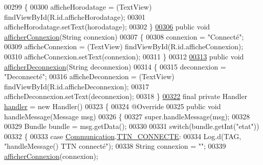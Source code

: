 \begin{DoxyCode}
{{{00299     \{
00300         afficheHorodatage = (TextView) findViewById(R.id.afficheHorodatage);
00301         afficheHorodatage.setText(horodatage);
00302     \}
\hyperlink{classcom_1_1example_1_1bee__honeyt_1_1_i_h_m_mobile_a09149878e7ab1c24fa1b3aea037bd3fc}{00306}     \textcolor{keyword}{public} \textcolor{keywordtype}{void} \hyperlink{classcom_1_1example_1_1bee__honeyt_1_1_i_h_m_mobile_a09149878e7ab1c24fa1b3aea037bd3fc}{afficherConnexion}(String connexion)
00307     \{
00308         connexion = \textcolor{stringliteral}{"Connecté"};
00309         afficheConnexion = (TextView) findViewById(R.id.afficheConnexion);
00310         afficheConnexion.setText(connexion);
00311     \}
00312 
\hyperlink{classcom_1_1example_1_1bee__honeyt_1_1_i_h_m_mobile_a8eeb63d847d450223c641107e2f27f1a}{00313}     \textcolor{keyword}{public} \textcolor{keywordtype}{void} \hyperlink{classcom_1_1example_1_1bee__honeyt_1_1_i_h_m_mobile_a8eeb63d847d450223c641107e2f27f1a}{afficherDeconnexion}(String deconnexion)
00314     \{
00315         deconnexion = \textcolor{stringliteral}{"Deconnecté"};
00316         afficheDeconnexion = (TextView) findViewById(R.id.afficheDeconnexion);
00317         afficheDeconnexion.setText(deconnexion);
00318     \}
\hyperlink{classcom_1_1example_1_1bee__honeyt_1_1_i_h_m_mobile_ab04ad38c9ee9a2621cb1b10cc2da1df2}{00322}     \textcolor{keyword}{final} \textcolor{keyword}{private} Handler \hyperlink{classcom_1_1example_1_1bee__honeyt_1_1_i_h_m_mobile_ab04ad38c9ee9a2621cb1b10cc2da1df2}{handler} = \textcolor{keyword}{new} Handler()
00323     \{
00324         @Override
00325         \textcolor{keyword}{public} \textcolor{keywordtype}{void} handleMessage(Message msg)
00326         \{
00327             super.handleMessage(msg);
00328 
00329             Bundle bundle = msg.getData();
00330 
00331             \textcolor{keywordflow}{switch}(bundle.getInt(\textcolor{stringliteral}{"etat"}))
00332             \{
00333                 \textcolor{keywordflow}{case} \hyperlink{classcom_1_1example_1_1bee__honeyt_1_1_communication}{Communication}.\hyperlink{classcom_1_1example_1_1bee__honeyt_1_1_communication_ad8ad53a30dea0bfcc57bad80cb67ab92}{TTN\_CONNECTE}:
00334                     Log.d(TAG, \textcolor{stringliteral}{"handleMessage() TTN connecté"});
00338                     String connexion = \textcolor{stringliteral}{""};
00339                     \hyperlink{classcom_1_1example_1_1bee__honeyt_1_1_i_h_m_mobile_a09149878e7ab1c24fa1b3aea037bd3fc}{afficherConnexion}(connexion);
}}}
\end{DoxyCode}
